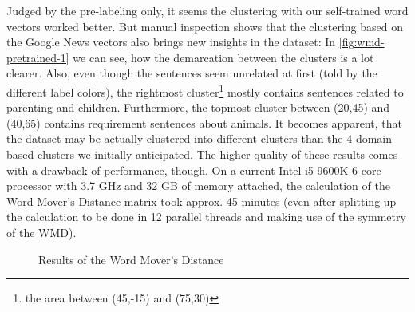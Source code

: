 Judged by the pre-labeling only, it seems the clustering with our self-trained word vectors worked better. But manual inspection shows that the clustering based on the Google News vectors also brings new insights in the dataset: In \autoref{fig:wmd-pretrained-1} we can see, how the demarcation between the clusters is a lot clearer. Also, even though the sentences seem unrelated at first (told by the different label colors), the rightmost cluster\footnote{the area between (45,-15) and (75,30)} mostly contains sentences related to parenting and children. Furthermore, the topmost cluster between (20,45) and (40,65) contains requirement sentences about animals. It becomes apparent, that the dataset may be actually clustered into different clusters than the 4 domain-based clusters we initially anticipated. The higher quality of these results comes with a drawback of performance, though. On a current Intel i5-9600K 6-core processor with 3.7 GHz and 32 GB of memory attached, the calculation of the Word Mover's Distance matrix took approx. 45 minutes (even after splitting up the calculation to be done in 12 parallel threads and making use of the symmetry of the WMD).


\begin{figure}[hbt]
	\centering
    \caption{Results of the Word Mover's Distance}
    \label{fig:wmd-comparison}
\end{figure}
\FloatBarrier
